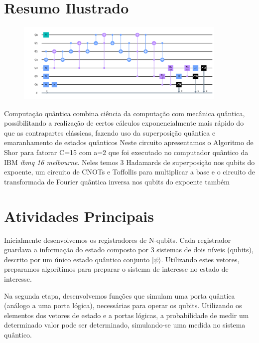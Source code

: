 \documentclass[12pt,a4paper]{article}
\begin{document}
\section*{Resumo Ilustrado}
\begin{figure}[h!]
    \centering
    \includegraphics[width=0.9\textwidth]{shora2draw.png}
 
    \label{fig:groovercq}
\end{figure}
Computação quântica combina ciência da computação com mecânica quântica, possibilitando a realização de certos cálculos exponencialmente mais rápido do que as contrapartes clássicas, fazendo uso da superposição quântica e emaranhamento de estados quânticos
Neste circuito apresentamos o Algoritmo de Shor para fatorar C=15 com a=2 que foi executado no computador quântico da IBM \textit{ibmq 16 melbourne}. Neles temos 3 Hadamards de superposição nos qubits do expoente, um circuito de CNOTs e Toffollis para multiplicar a base e o circuito de transformada de Fourier quântica inversa nos qubits do expoente também



\newpage

\section{Atividades Principais}

 Inicialmente desenvolvemos os registradores de N-qubits. Cada registrador guardava a informação do estado composto por 3 sistemas de dois níveis (qubits), descrito por um único estado quântico conjunto $|\psi\rangle$.  Utilizando estes vetores, preparamos algorítimos para preparar o sistema de interesse no estado de interesse. 

Na segunda etapa, desenvolvemos funções que simulam uma porta quântica (análogo a uma porta lógica), necessárias para operar os qubits. Utilizando os elementos dos vetores de estado e a portas lógicas, a probabilidade de medir um determinado valor pode ser determinado, simulando-se uma medida no sistema quântico. 
\end{document}
